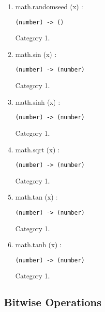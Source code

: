 \begin{enumerate}
\begin{verbatim}
\end{verbatim}
\item math.randomseed (x) :
\begin{verbatim}
(number) -> ()
\end{verbatim}
Category 1.
\item math.sin (x) :
\begin{verbatim}
(number) -> (number)
\end{verbatim}
Category 1.
\item math.sinh (x) :
\begin{verbatim}
(number) -> (number)
\end{verbatim}
Category 1.
\item math.sqrt (x) :
\begin{verbatim}
(number) -> (number)
\end{verbatim}
Category 1.
\item math.tan (x) :
\begin{verbatim}
(number) -> (number)
\end{verbatim}
Category 1.
\item math.tanh (x) :
\begin{verbatim}
(number) -> (number)
\end{verbatim}
Category 1.
\end{enumerate}

\subsection{Bitwise Operations}


